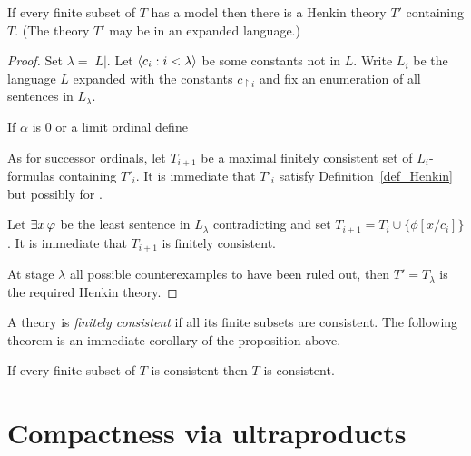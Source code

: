 \documentclass[creche.tex]{subfiles}
\begin{document}
\begin{proposition}If every finite subset of $T$ has a model then there is a Henkin theory $T'$ containing $T$. (The theory $T'$ may be in an expanded language.)
\end{proposition}

\begin{proof} Set $\lambda=|L|$. Let $\langle c_i:i<\lambda\rangle$ be some constants not in $L$. Write $L_i$ be the language $L$ expanded with the constants $c_{\restriction i}$ and fix an enumeration of all sentences in $L_\lambda$. 

If $\alpha$ is $0$ or a limit ordinal define 


As for successor ordinals, let $T_{i+1}$ be a maximal finitely consistent set of $L_i$-formulas containing $T'_i$. It is immediate that $T'_i$ satisfy Definition~\ref{def_Henkin} but possibly for .

Let $\exists x\, \varphi$ be the least sentence in $L_\lambda$ contradicting  and set $T_{i+1}=T_i\cup\big\{\phi[x/c_i]\big\}$. It is immediate that $T_{i+1}$ is finitely consistent. 

At stage $\lambda$ all possible counterexamples to  have been ruled out, then $T'=T_\lambda$ is the required Henkin theory.
\end{proof}

A theory is \emph{finitely consistent\/} if all its finite subsets are consistent. The following theorem is an immediate corollary of the proposition above.

\begin{void_thm}
If every finite subset of $T$ is consistent then $T$ is consistent.\QED
\end{void_thm}



\section{Compactness via ultraproducts}\label{compactness}
\def\medrel#1{\parbox[t]{6ex}{$\displaystyle\hfil #1$}}
\def\ceq#1#2#3{\parbox{25ex}{$\displaystyle #1$}\medrel{#2}$\displaystyle  #3$}
\end{document}
